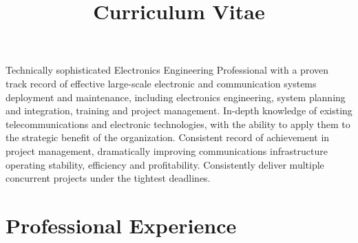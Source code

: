 \documentclass[10pt,letterpaper,sans]{moderncv} %
\title{Curriculum Vitae}
\begin{document}
\makecvtitle %



Technically sophisticated Electronics Engineering Professional with a proven track record of effective large-scale electronic and communication systems deployment and maintenance, including electronics engineering, system planning and integration, training and project management. In-depth knowledge of existing telecommunications and electronic technologies, with the ability to apply them to the strategic benefit of the organization. Consistent record of achievement in project management, dramatically improving communications infrastructure operating stability, efficiency and profitability. Consistently deliver multiple concurrent projects under the tightest deadlines.
\section{Professional Experience}



\end{document}
